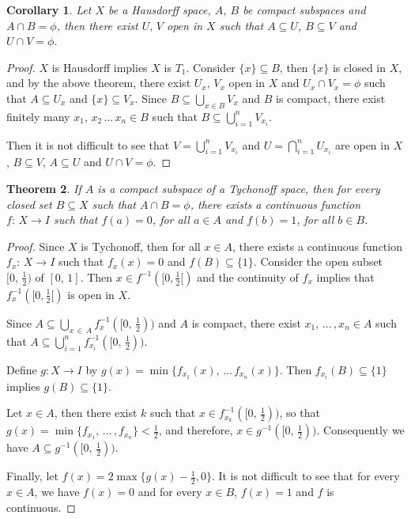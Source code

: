 \documentclass[12pt,oneside,english]{amsbook}
\numberwithin{equation}{section} %
\numberwithin{figure}{section} %
\theoremstyle{plain}
\numberwithin{section}{chapter}
\newtheorem{thm}{Theorem}[section]
\theoremstyle{plain}
\newtheorem{corollary}[thm]{Corollary}
\begin{document}
\begin{corollary}
  Let $X$ be a Hausdorff space, $A$, $B$ be compact subspaces and $A \cap B  =  \phi$, then there exist $U, \, V$ open in $X$ such that $A  \subseteq  U$, $B  \subseteq  V$ and $U \cap V  =  \phi$.
\end{corollary}
\begin{proof}
  $X$ is Hausdorff implies $X$ is $T_{1}$. Consider $\{x\}  \subseteq  B$, then $\{x\}$ is closed in $X$, and by the above theorem, there exist $U_{x}, \, V_{x}$ open in $X$ and $U_{x} \cap V_{x}  =  \phi$ such that $A  \subseteq  U_{x}$ and $\{x\}  \subseteq  V_{x}$. Since $B  \subseteq  \bigcup_{x  \in  B} V_{x}$ and $B$ is compact, there exist finitely many $ x_{1}, \, x_{2} \, \ldots \, x_{n} \in B$ such that $B  \subseteq  \bigcup_{i  =  1}^{n}V_{x_{i}}$.

  Then it is not difficult to see that $V = \bigcup_{i = 1}^n V_{x_i}$ and $U = \bigcap_{i = 1}^n U_{x_i}$ are open in $X$, $B \subseteq V$, $A \subseteq U$ and $U \cap V = \phi$.
\end{proof}

\begin{thm}
  If $A$ is a compact subspace of a Tychonoff space, then for every closed set $B \subseteq X$ such that $A \cap B  =  \phi$, there exists  a continuous function $f:\, X \to I$ such that $f(a)  =  0$, for all $a \in A$ and $f(b)  =  1$, for all $b  \in  B$. 
\end{thm}
\begin{proof}
  Since $X$ is Tychonoff, then for all $x  \in  A$, there exists a continuous function $f_{x}: \, X \to I$ such that $f_{x}(x)  =  0$ and $f(B)  \subseteq  \{1\}$. Consider the open subset $[0, \, \frac{1}{2})$ of $[0, \, 1]$. Then $x \in f^{-1}([0,\frac{1}{2}[)$ and the continuity of $f_x$ implies that $f^{-1}_x([0,\frac{1}{2}[)$ is open in $X$. 
  
  Since $A  \subseteq  \bigcup_{x \, \in \, A}f_{x}^{-1}([0, \, \frac{1}{2}))$ and $A$ is compact, there exist $x_{1}, \, \ldots \, , x_{n} \in A$ such that $A  \subseteq  \bigcup_{i  =  1}^{n}f_{x_{i}}^{-1}([0, \, \frac{1}{2}))$.

  Define $g: X \to I$ by $g(x)  =  \min{\{f_{x_{1}}(x), \, \ldots \, f_{x_{n}}(x)\}}$. Then $f_{x_{i}}(B)  \subseteq  \{1\}$ implies $g(B)  \subseteq  \{1\}$.

  Let $x  \in  A$, then there exist $k$ such that $x  \in  f_{x_{k}}^{-1}([0, \, \frac{1}{2}))$, so that $g(x) = \min{\{f_{x_{1}}, \, \ldots \, , f_{x_{n}}\}} < \frac{1}{2}$, and  therefore, $x  \in  g^{-1}([0, \, \frac{1}{2}))$. Consequently we have $A  \subseteq  g^{-1}([0, \, \frac{1}{2}))$.

  Finally, let $f(x)  =  2 \max{\{g(x) - \frac{1}{2}, 0\}}$. It is not difficult to see that for every $x \in A$, we have $f(x)  =  0$ and for every $x \in B$, $f(x)  =  1$ and $f$ is continuous.
\end{proof}
\end{document}
